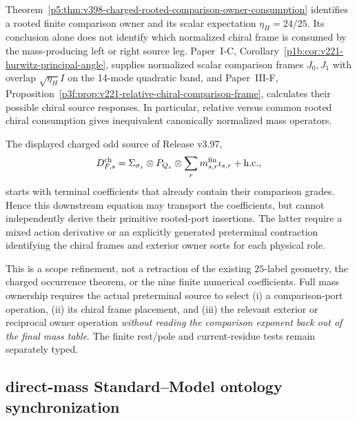 \documentclass[12pt,a4paper]{article}
\begin{document}
\begin{proposition}
\label{p5:prop:v221-charged-comparison-source-scope}
Theorem~\ref{p5:thm:v398-charged-rooted-comparison-owner-consumption}
identifies a rooted finite comparison owner and its scalar expectation
$\eta_H=24/25$.  Its conclusion alone does not identify which
normalized chiral frame is consumed by the mass-producing left or
right source leg.  Paper~I-C,
Corollary~\ref{p1b:cor:v221-hurwitz-principal-angle}, supplies
normalized scalar comparison frames $J_0,J_1$ with overlap
$\sqrt{\eta_H}I$ on the 14-mode quadratic band, and
Paper~III-F, Proposition~\ref{p3f:prop:v221-relative-chiral-comparison-frame},
calculates their possible chiral source responses.  In particular,
relative versus common rooted chiral consumption gives inequivalent
canonically normalized mass operators.

The displayed charged odd source of Release v3.97,
\[
 D_{F,s}^{\rm ch}=\Sigma_{\sigma_s}\otimes P_{Q_s}
 \otimes\sum_r m_{s,r}^{\rm fin}\iota_{s,r}+\mathrm{h.c.},
\]
starts with terminal coefficients that already contain their
comparison grades.  Hence this downstream equation may transport the
coefficients, but cannot independently derive their primitive
rooted-port insertions.  The latter require a mixed action derivative
or an explicitly generated preterminal contraction identifying the
chiral frames and exterior owner sorts for each physical role.
\end{proposition}
\begin{remark}
\label{p5:rem:v221-charged-source-port-certificate}
This is a scope refinement, not a retraction of the existing
$25$-label geometry, the charged occurrence theorem, or the nine
finite numerical coefficients.  Full mass ownership requires the
actual preterminal source to select (i) a comparison-port operation,
(ii) its chiral frame placement, and (iii) the relevant exterior or
reciprocal owner operation \emph{without reading the comparison
exponent back out of the final mass table}.  The finite rest/pole
and current-residue tests remain separately typed.
\end{remark}



\subsection{direct-mass Standard--Model ontology synchronization}
\label{p5:sec:v399-direct-mass-sm-ontology}
\end{document}
